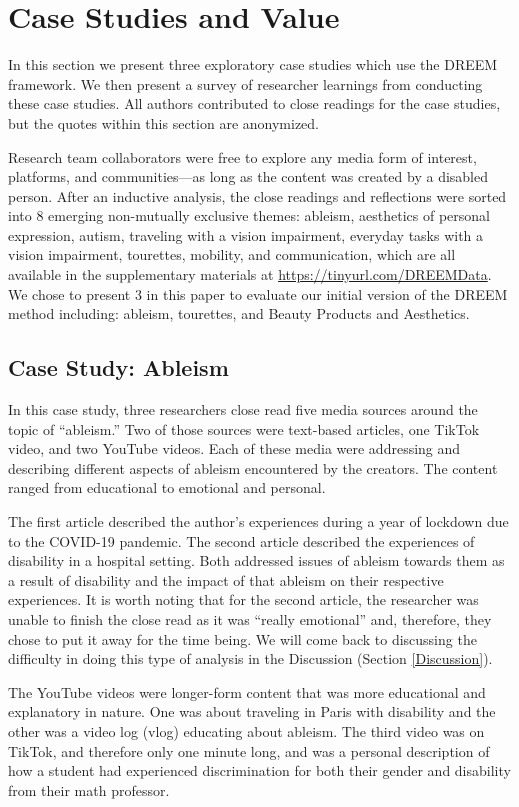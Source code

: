 \section{Case Studies and Value} \label{CaseStudies}
In this section we present three exploratory case studies which use the DREEM framework. 
We then present a survey of researcher learnings from conducting these case studies. 
All authors contributed to close readings for the case studies, but the quotes within this section are anonymized.

 Research team collaborators were free to explore any media form of interest, platforms, and communities—as long as the content was created by a disabled person. After an inductive analysis, the close readings and reflections were sorted into 8 emerging non-mutually exclusive themes: ableism, aesthetics of personal expression, autism, traveling with a vision impairment, everyday tasks with a vision impairment, tourettes, mobility, and communication, which are all available in the supplementary materials at \url{https://tinyurl.com/DREEMData}. We chose to present 3 in this paper to evaluate our initial version of the DREEM method including: ableism, tourettes, and Beauty Products and Aesthetics. 

\subsection{Case Study: Ableism} \label{case:ableism}
In this case study, three researchers close read five media sources around the topic of ``ableism.'' Two of those sources were text-based articles, one TikTok video, and two YouTube videos. Each of these media were addressing and describing different aspects of ableism encountered by the creators. The content ranged from educational to emotional and personal.

The first article described the author's experiences during a year of lockdown due to the COVID-19 pandemic. The second article described the experiences of disability in a hospital setting. Both addressed issues of ableism towards them as a result of disability and the impact of that ableism on their respective experiences. It is worth noting that for the second article, the researcher was unable to finish the close read as it was ``really emotional'' and, therefore, they chose to put it away for the time being. We will come back to discussing the difficulty in doing this type of analysis in the Discussion (Section \ref{Discussion}). 

The YouTube videos were longer-form content that was more educational and explanatory in nature. One was about traveling in Paris with disability and the other was a video log (vlog) educating about ableism. The third video was on TikTok, and therefore only one minute long, and was a personal description of how a student had experienced discrimination for both their gender and disability from their math professor.

